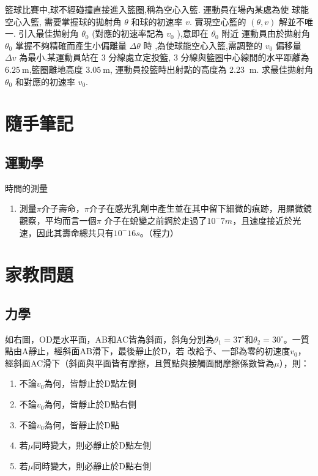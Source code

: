 \documentclass[cn,10pt,math=newtx,chinesefont=founder]{../elegantbook}
\begin{document}
\begin{example}
籃球比賽中,球不經碰撞直接進入籃圈,稱為空心入籃. 運動員在場內某處為使 球能空心入籃,
需要掌握球的拋射角 $\theta$ 和球的初速率 $v$. 實現空心籃的 $(\theta, v)$ 解並不唯一. 
引入最佳拋射角 $\theta_{0}$ (對應的初速率記為 $v_{0}$ ),意即在 $\theta_{0}$ 附近
運動員由於拋射角 $\theta_{0}$ 掌握不夠精確而產生小偏離量 $\Delta \theta$ 時
,為使球能空心入籃,需調整的 $v_{0}$ 偏移量 $\Delta v$ 為最小.某運動員站在 3 分線處立定投籃, 
3 分線與籃圈中心線間的水平距離為 $6.25 \mathrm{~m}$,籃圈離地高度 $3.05 \mathrm{~m}$, 
運動員投籃時出射點的高度為 2.23 $\mathrm{~m}$. 求最佳拋射角 $\theta_{0}$ 和對應的初速率 $v_{0}$.
\end{example}
\begin{solution}
    
\end{solution}


\chapter{隨手筆記}
\section{運動學}
時間的測量
\begin{enumerate}
    \item 測量$\pi$介子壽命，$\pi$介子在感光乳劑中產生並在其中留下細微的痕跡，用顯微鏡觀察，平均而言一個$\pi$
          介子在蛻變之前錒於走過了$10^-7 m$，且速度接近於光速，因此其壽命總共只有$10^-16 s$。（程力）
\end{enumerate}
\chapter{家教問題}
\section{力學}

\begin{example}
    如右圖，OD是水平面，AB和AC皆為斜面，斜角分別為$\theta_1 = 37^\circ$和$\theta_2 = 30^\circ$。一質點由A靜止，經斜面AB滑下，最後靜止於D，若
    改給予、一部為零的初速度$v_0$，經斜面AC滑下（斜面與平面皆有摩擦，且質點與接觸面間摩擦係數皆為$\mu$），則：
    \begin{enumerate}[label=(\Alph*)]
        \item 不論$v_0$為何，皆靜止於D點左側
        \item 不論$v_0$為何，皆靜止於D點右側
        \item 不論$v_0$為何，皆靜止於D點
        \item 若$\mu$同時變大，則必靜止於D點左側
        \item 若$\mu$同時變大，則必靜止於D點右側
    \end{enumerate}
\end{example}
\end{document}
